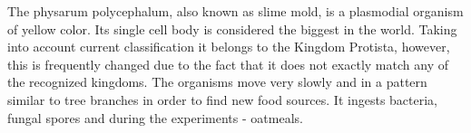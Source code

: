 The physarum polycephalum, also known as slime mold, is a plasmodial organism of yellow color. Its single cell body is considered the biggest in the world. Taking into account current classification it belongs to the Kingdom Protista, however, this is frequently changed due to the fact that it does not exactly match any of the recognized kingdoms. The organisms move very slowly and in a pattern similar to tree branches in order to find new food sources. It ingests bacteria, fungal spores and during the experiments - oatmeals.








